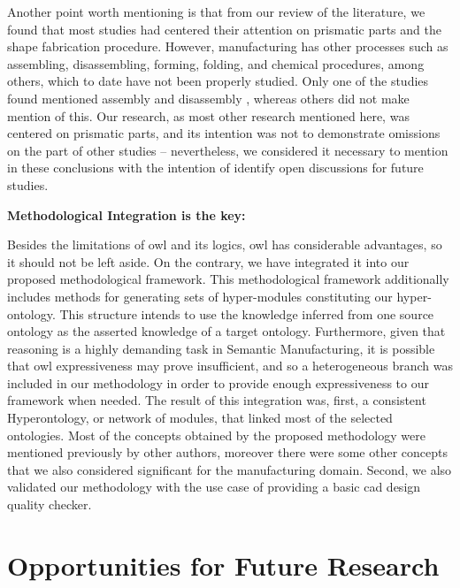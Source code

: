 Another point worth mentioning is that from our review of the literature, we found that most studies had centered their attention on prismatic parts and the shape fabrication procedure. However, manufacturing has other processes such as assembling, disassembling, forming, folding, and chemical procedures, among others, which to date have not been properly studied. Only one of the studies found mentioned assembly and disassembly \cite{vegetti_pronto:_2011}, whereas others did not make mention of this. Our research, as most other research mentioned here, was centered on prismatic parts, and its intention was not to demonstrate omissions on the part of other studies -- nevertheless, we considered it necessary to mention in these conclusions with the intention of identify open discussions for future studies.

\noindent \textbf{Methodological Integration is the key:}

Besides the limitations of \gls{owl} and its logics, \gls{owl} has considerable advantages, so it should not be left aside. On the contrary, we have integrated it into our proposed methodological framework. This methodological framework additionally includes methods for generating sets of hyper-modules constituting our hyper-ontology. This structure intends to use the knowledge inferred from one source ontology as the asserted knowledge of a target ontology. Furthermore, given that reasoning is a highly demanding task in Semantic Manufacturing, it is possible that \gls{owl} expressiveness may prove insufficient, and so a heterogeneous branch was included in our methodology in order to provide enough expressiveness to our framework when needed. The result of this integration was, first, a consistent Hyperontology, or network of modules, that linked most of the selected ontologies. Most of the concepts obtained by the proposed methodology were mentioned previously by other authors, moreover there were some other concepts that we also considered significant for the manufacturing domain.  Second, we also validated our methodology with the use case of providing a basic \gls{cad} design quality checker. 


\section{Opportunities for Future Research}

